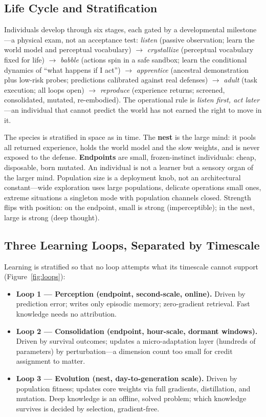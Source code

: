 \documentclass[11pt,a4paper]{article}
\begin{document}
\subsection{Life Cycle and Stratification}
\label{sec:stratification}

Individuals develop through six stages, each gated by a developmental milestone---a physical exam, not an acceptance test: \emph{listen} (passive observation; learn the world model and perceptual vocabulary) $\to$ \emph{crystallize} (perceptual vocabulary fixed for life) $\to$ \emph{babble} (actions spin in a safe sandbox; learn the conditional dynamics of ``what happens if I act'') $\to$ \emph{apprentice} (ancestral demonstration plus low-risk probes; predictions calibrated against real defenses) $\to$ \emph{adult} (task execution; all loops open) $\to$ \emph{reproduce} (experience returns; screened, consolidated, mutated, re-embodied). The operational rule is \emph{listen first, act later}---an individual that cannot predict the world has not earned the right to move in it.

The species is stratified in space as in time. The \textbf{nest} is the large mind: it pools all returned experience, holds the world model and the slow weights, and is never exposed to the defense. \textbf{Endpoints} are small, frozen-instinct individuals: cheap, disposable, born mutated. An individual is not a learner but a sensory organ of the larger mind. Population size is a deployment knob, not an architectural constant---wide exploration uses large populations, delicate operations small ones, extreme situations a singleton mode with population channels closed. Strength flips with position: on the endpoint, small is strong (imperceptible); in the nest, large is strong (deep thought).

\subsection{Three Learning Loops, Separated by Timescale}
\label{sec:loops}

Learning is stratified so that no loop attempts what its timescale cannot support (Figure~\ref{fig:loops}):

\begin{itemize}[leftmargin=1.4em,itemsep=1pt]
  \item \textbf{Loop 1 --- Perception (endpoint, second-scale, online).} Driven by prediction error; writes only episodic memory; zero-gradient retrieval. Fast knowledge needs no attribution.
  \item \textbf{Loop 2 --- Consolidation (endpoint, hour-scale, dormant windows).} Driven by survival outcomes; updates a micro-adaptation layer (hundreds of parameters) by perturbation---a dimension count too small for credit assignment to matter.
  \item \textbf{Loop 3 --- Evolution (nest, day-to-generation scale).} Driven by population fitness; updates core weights via full gradients, distillation, and mutation. Deep knowledge is an offline, solved problem; which knowledge survives is decided by selection, gradient-free.
\end{itemize}
\end{document}
